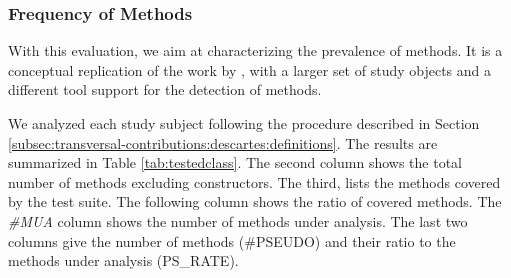 \subsubsection{Frequency of \pseudotested Methods}
\label{subsubsec:transversal-contributions:descartes:evaluation:frequency}

With this evaluation, we aim at characterizing the prevalence of \pseudotested{} methods. 
It is a conceptual replication of the work by \theoriginalauthors, with a larger set of study objects and a different tool support for the detection of \pseudotested{} methods.

We analyzed each study subject following the procedure described in Section \ref{subsec:transversal-contributions:descartes:definitions}. The results are summarized in Table \ref{tab:testedclass}. The second column shows the total number of methods excluding constructors. The third, lists the methods covered by the test suite. The following column shows the ratio of covered methods. The \textit{\#MUA} column shows the number of methods under analysis. The last two columns give the number of \pseudotested{} methods (\#PSEUDO) and their ratio to the methods under analysis (PS\_RATE).

